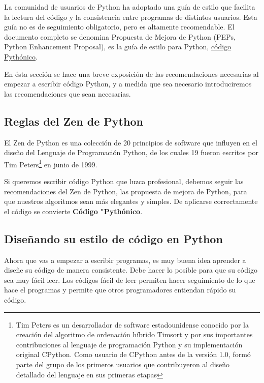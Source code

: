 La comunidad de usuarios de Python ha adoptado una guía de estilo que facilita la lectura del código y la consistencia entre programas de distintos usuarios. Esta guía no es de seguimiento obligatorio, pero es altamente recomendable. El documento completo se denomina Propuesta de Mejora de Python (PEPs, Python Enhancement Proposal), es la guía de estilo para Python, \href{https://elpythonista.com/zen-de-python}{\color{vino}código Pythónico}.


En ésta sección se hace una breve exposición de las recomendaciones necesarias al empezar a escribir código Python, y a medida que sea necesario introduciremos las recomendaciones que sean necesarias.

\subsection*{Reglas del Zen de Python}
El Zen de Python es una colección de 20 principios de software que influyen en el diseño del
Lenguaje de Programación Python, de los cuales 19 fueron escritos por Tim Peters\footnote{\scriptsize{Tim Peters es un desarrollador de software estadounidense conocido por la creación del algoritmo de ordenación híbrido Timsort y por sus importantes contribuciones al lenguaje de programación Python y su implementación original CPython. Como usuario de CPython antes de la versión 1.0, formó parte del grupo de los primeros usuarios que contribuyeron al diseño detallado del lenguaje en sus primeras etapas}} en junio de 1999. 

Si queremos escribir código Python que luzca profesional, debemos seguir las recomendaciones del Zen de Python, las  propuesta de mejora de Python, para que nuestros algoritmos sean más elegantes y simples. De aplicarse correctamente el código se convierte {\bf{Código  "Pythónico}}.


\subsection*{Diseñando su estilo de código en Python}  %

Ahora que vas a  empezar  a escribir  programas, es muy buena idea aprender a diseñe su código de manera consistente. Debe hacer lo posible para que su código sea muy fácil leer. Los códigos fácil de leer permiten hacer seguimiento de lo que hace el programas y permite que otros programadores entiendan rápido su código.

